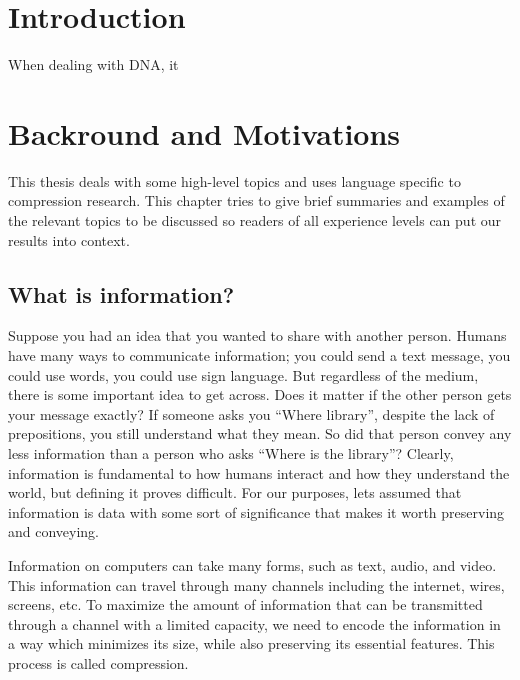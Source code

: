 \documentclass[12pt,twoside]{reedthesis}
\begin{document}
\hypertarget{introduction}{%
\chapter*{Introduction}\label{introduction}}

When dealing with DNA, it

\hypertarget{backround-and-motivations}{%
\chapter{Backround and Motivations}\label{backround-and-motivations}}

This thesis deals with some high-level topics and uses language specific to compression research. This chapter tries to give brief summaries and examples of the relevant topics to be discussed so readers of all experience levels can put our results into context.

\hypertarget{what-is-information}{%
\section{What is information?}\label{what-is-information}}

Suppose you had an idea that you wanted to share with another person. Humans have many ways to communicate information; you could send a text message, you could use words, you could use sign language. But regardless of the medium, there is some important idea to get across. Does it matter if the other person gets your message exactly? If someone asks you ``Where library'', despite the lack of prepositions, you still understand what they mean. So did that person convey any less information than a person who asks ``Where is the library''?
Clearly, information is fundamental to how humans interact and how they understand the world, but defining it proves difficult. For our purposes, lets assumed that information is data with some sort of significance that makes it worth preserving and conveying.

Information on computers can take many forms, such as text, audio, and video. This information can travel through many channels including the internet, wires, screens, etc. To maximize the amount of information that can be transmitted through a channel with a limited capacity, we need to encode the information in a way which minimizes its size, while also preserving its essential features. This process is called compression.
\end{document}
